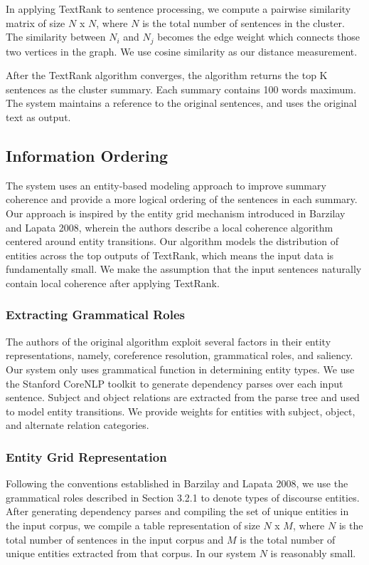 \documentclass[11pt]{article}
\begin{document}
In applying TextRank to sentence processing, we compute a pairwise similarity matrix of size $N$ x $N$, where $N$ is the total number of sentences in the cluster. The similarity between $N_i$ and $N_j$ becomes the edge weight which connects those two vertices in the graph. We use cosine similarity as our distance measurement.

After the TextRank algorithm converges, the algorithm returns the top K sentences as the cluster summary. Each summary contains 100 words maximum. The system maintains a 
reference to the original sentences, and uses the original text as output.

\subsection{Information Ordering}
The system uses an entity-based modeling approach to improve summary coherence and provide a more logical ordering of the sentences in each summary. Our approach is inspired by the entity grid mechanism introduced in Barzilay and Lapata 2008, wherein the authors describe a local coherence algorithm centered around entity transitions. Our algorithm models the distribution of entities across the top outputs of TextRank, which means the input data is fundamentally small. We make the assumption that the input sentences naturally contain local coherence after applying TextRank. 

\subsubsection{Extracting Grammatical Roles}
The authors of the original algorithm exploit several factors in their entity representations, namely, coreference resolution, grammatical roles, and saliency. Our system only uses grammatical function in determining entity types. We use the Stanford CoreNLP toolkit to generate dependency parses over each input sentence. Subject and object relations are extracted from the parse tree and used to model entity transitions. We provide weights for entities with subject, object, and alternate relation categories.

\subsubsection{Entity Grid Representation}
Following the conventions established in Barzilay and Lapata 2008, we use the grammatical roles described in Section 3.2.1 to denote types of discourse entities. After generating dependency parses and compiling the set of unique entities in the input corpus, we compile a table representation of size $N$ x $M$, where $N$ is the total number of sentences in the input corpus and $M$ is the total number of unique entities extracted from that corpus. In our system $N$ is reasonably small.
\end{document}
